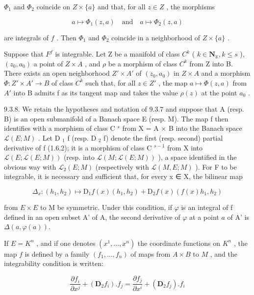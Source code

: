 \(\Phi_{1}\) and \(\Phi_{2}\) coincide on \(Z \times \{a\}\) and that, for all \(z \in Z\) , the morphisms

\[
a \mapsto \Phi_ {1} (z, a) \quad \text {and} \quad a \mapsto \Phi_ {2} (z, a)
\]

are integrals of \(f\) . Then \(\Phi_{1}\) and \(\Phi_{2}\) coincide in a neighborhood of \(Z \times \{a\}\) .

Suppose that \(F^{f}\) is integrable. Let Z be a manifold of class \(C^{k}\) ( \(k \in \mathbf{N}_{\mathbb{K}}, k \leqslant s\) ), \((z_{0}, a_{0})\) a point of \(Z \times A\) , and \(\rho\) be a morphism of class \(C^{k}\) from Z into B. There exists an open neighborhood \(Z' \times A'\) of \((z_{0}, a_{0})\) in \(Z \times A\) and a morphism \(\Phi: Z' \times A' \to B\) of class \(C^{k}\) such that, for all \(z \in Z'\) , the map \(a \mapsto \Phi(z, a)\) from \(A'\) into B admits f as its tangent map and takes the value \(\rho(z)\) at the point \(a_{0}\) .

9.3.8. We retain the hypotheses and notation of 9.3.7 and suppose that A (resp. B) is an open submanifold of a Banach space E (resp. M). The map f then identifies with a morphism of class C \(^{s}\) from X = A × B into the Banach space \(\mathcal{L}(E; M)\) . Let D \(_{1}\) f (resp. D \(_{2}\) f) denote the first (resp. second) partial derivative of f (1.6.2); it is a morphism of class C \(^{s-1}\) from X into \(\mathcal{L}(E; \mathcal{L}(E; M))\) (resp. into \(\mathcal{L}(M; \mathcal{L}(E; M))\) ), a space identified in the obvious way with \(\mathcal{L}_{2}(E; M)\) (respectively with \(\mathcal{L}(M, E; M)\) ). For F to be integrable, it is necessary and sufficient that, for every x ∈ X, the bilinear map

\[
\Delta_ {x}: (h _ {1}, h _ {2}) \mapsto \mathrm{D} _ {1} f (x) (h _ {1}, h _ {2}) + \mathrm{D} _ {2} f (x) (f (x) h _ {1}, h _ {2})
\]

from \(E \times E\) to M be symmetric. Under this condition, if \(\varphi\) is an integral of f defined in an open subset A' of A, the second derivative of \(\varphi\) at a point \(a\) of A' is \(\Delta(a,\varphi(a))\).

If \(E = K^n\) , and if one denotes \((x^1, \ldots, x^n)\) the coordinate functions on \(K^n\) , the map \(f\) is defined by a family \((f_1, \ldots, f_n)\) of maps from \(A \times B\) to \(M\) , and the integrability condition is written:

\[
\frac {\partial f _ {i}}{\partial x ^ {j}} + (\mathbf {D} _ {2} f _ {i}). f _ {j} = \frac {\partial f _ {j}}{\partial x ^ {i}} + (\mathbf {D} _ {2} f _ {j}). f _ {i}
\]

